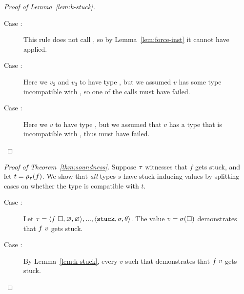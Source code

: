 \begin{proof}[Proof of Lemma~\ref{lem:k-stuck}]
\begin{description}
\begin{description}
    \item[Case \releafgood:] This rule does not call \forcesym, so by
      Lemma~\ref{lem:force-inst} it cannot have applied.
    \item[Case \renodegood:] Here we \forcesym $v_2$ and $v_3$ to have
      type \ttree{\thole}, but we assumed $v$ has some type incompatible
      with \ttree{\thole}, so one of the \forcesym calls must have
      failed.
    \item[Case :] Here we \forcesym $v$ to
      have type \ttree{\thole}, but we assumed that $v$ has a type that
      is incompatible with \ttree{\thole}, thus \forcesym must have
      failed.
    \end{description}
  \end{description}
\end{proof}

\begin{proof}[Proof of Theorem~\ref{thm:soundness}]
Suppose $\tau$ witnesses that $f$ gets stuck,
and let $t = \rho_{\tau}(f)$.
We show that \emph{all} types $s$ have stuck-inducing
values by splitting cases on whether the type is
compatible with $t$. %
%
\begin{description}
\item [Case :]
  Let $\tau = \langle f\ \square{}, \varnothing, \varnothing \rangle,...,\langle \mathtt{stuck}, \sigma, \theta \rangle$.
  The value $v = \sigma(\square)$ demonstrates that
  $f\ v$ gets stuck.
\item [Case :] By Lemma~\ref{lem:k-stuck}, every $v$
  such that  demonstrates that $f\ v$ gets stuck.
\end{description}
\end{proof}
